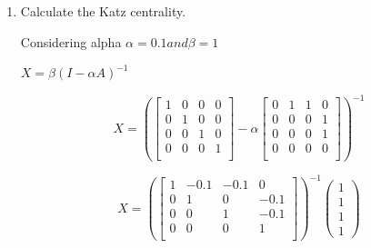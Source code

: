 \documentclass{amsart}
\theoremstyle{definition}
\theoremstyle{remark}
\numberwithin{equation}{section}
\begin{document}
\begin{enumerate}
\begin{enumerate}
\vspace{0.2cm}
\item Calculate the Katz centrality. \vspace{0.2cm}

Considering alpha $\alpha = 0.1 and \beta = 1$ \vspace{0.2cm}

$X = \beta \left(I - \alpha A\right)^{-1}$ \vspace{0.2cm}


\begin{equation*}
    {X}  = 
    \left(
    \left\lbrack\begin{array}{cccc}
    1 & 0 & 0 & 0 \\
    0 & 1 & 0 & 0 \\
    0 & 0 & 1 & 0 \\
    0 & 0 & 0 & 1 \\
    \end{array}\right\rbrack
    - \alpha
    \left\lbrack\begin{array}{cccc}
    0 & 1 & 1 & 0 \\
    0 & 0 & 0 & 1 \\
    0 & 0 & 0 & 1 \\
    0 & 0 & 0 & 0 \\
    \end{array}\right\rbrack
    \right)^{-1}
\end{equation*}

\begin{equation*}
    {X}  = 
    \left(
    \left\lbrack\begin{array}{cccc}
    1 & -0.1 & -0.1 & 0 \\
    0 & 1 & 0 & -0.1 \\
    0 & 0 & 1 & -0.1 \\
    0 & 0 & 0 & 1 \\
    \end{array}\right\rbrack
    \right)^{-1}
    \begin{pmatrix} 
        1 \\ 
        1 \\ 
        1 \\ 
        1
    \end{pmatrix}
\end{equation*}


\end{enumerate}
\end{enumerate}
\end{document}
